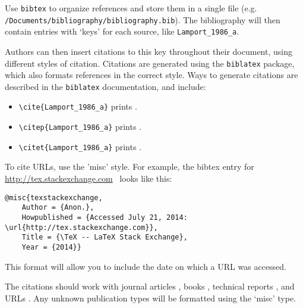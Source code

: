 Use \texttt{bibtex} to organize references and store them in a single file (e.g. \verb+/Documents/bibliography/bibliography.bib+). The bibliography will then contain entries with `keys' for each source, like \texttt{Lamport\_1986\_a}. 

Authors can then insert citations to this key throughout their document, using different styles of citation. Citations are generated using the \texttt{biblatex} package, which also formats references in the correct style.  Ways to generate citations are described in the \texttt{biblatex} documentation, and include:
\begin{itemize}
\item \verb+\cite{Lamport_1986_a}+ prints \cite{Lamport_1986_a}.
\item \verb+\citep{Lamport_1986_a}+ prints \citep{Lamport_1986_a}.
\item \verb+\citet{Lamport_1986_a}+ prints \citet{Lamport_1986_a}.
\end{itemize}

To cite URLs, use the 'misc' style. For example, the bibtex entry for \href{http://tex.stackexchange.com}{http://tex.stackexchange.com}\ \citep{texstackexchange} looks like this:

\begin{lstlisting}
@misc{texstackexchange,
	Author = {Anon.},
	Howpublished = {Accessed July 21, 2014: \url{http://tex.stackexchange.com}},
	Title = {\TeX -- LaTeX Stack Exchange},
	Year = {2014}}
\end{lstlisting}

This format will allow you to include the date on which a URL was accessed.

The citations should work with journal articles \citep{Clifton_2013_a}, books \citep{Knuth_1984_a, Lamport_1986_a, chicago}, technical reports \citep{TechReportTest}, and URLs \citep{texstackexchange}. Any unknown publication types will be formatted using the `misc' type.
